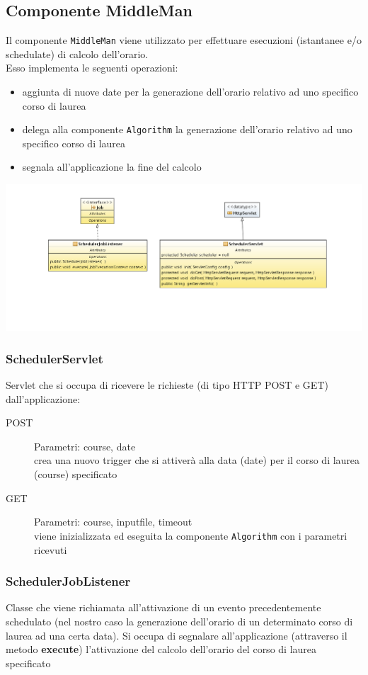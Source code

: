 \documentclass[11pt,a4paper]{article}
\begin{document}
\subsection{Componente MiddleMan}
Il componente \verb|MiddleMan| viene utilizzato per effettuare esecuzioni (istantanee e/o schedulate) di calcolo dell'orario. \\ 
Esso implementa le seguenti operazioni:
\begin{itemize}
\item aggiunta di nuove date per la generazione dell'orario relativo ad uno specifico corso di laurea
\item delega alla componente \verb|Algorithm| la generazione dell'orario relativo ad uno specifico corso di laurea
\item segnala all'applicazione la fine del calcolo 
\end{itemize}
\includegraphics[scale=0.34]{images/MMserv_diagram_class.png}
\subsubsection{SchedulerServlet}
Servlet che si occupa di ricevere le richieste (di tipo HTTP POST e GET) dall'applicazione:
\begin{description}
\item[POST]
Parametri: course, date\\
crea una nuovo trigger che si attiverà alla data (date) per il corso di laurea (course) specificato 
\item[GET]
Parametri: course, inputfile, timeout\\
viene inizializzata ed eseguita la componente \verb|Algorithm| con i parametri ricevuti
\end{description}
\subsubsection{SchedulerJobListener}
Classe che viene richiamata all'attivazione di un evento precedentemente schedulato (nel nostro caso la generazione dell'orario di un determinato corso di laurea ad una certa data).
Si occupa di segnalare all'applicazione (attraverso il metodo \textbf{execute}) l'attivazione del calcolo dell'orario del corso di laurea specificato  
\end{document}
